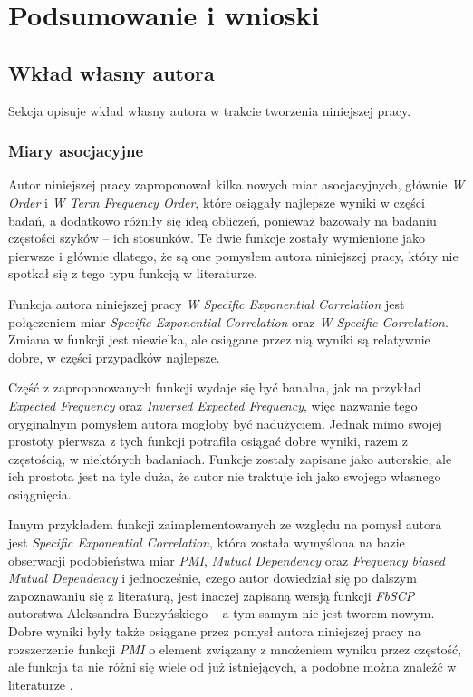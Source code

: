 
\chapter{Podsumowanie i wnioski}

\section{Wkład własny autora}
Sekcja opisuje wkład własny autora w trakcie tworzenia niniejszej pracy.

\subsection{Miary asocjacyjne}
Autor niniejszej pracy zaproponował kilka nowych miar asocjacyjnych, głównie \emph{W Order} i \emph{W Term Frequency Order}, które osiągały najlepsze wyniki w części badań, a dodatkowo różniły się ideą obliczeń, ponieważ bazowały na badaniu częstości szyków -- ich stosunków.
Te dwie funkcje zostały wymienione jako pierwsze i głównie dlatego, że są one pomysłem autora niniejszej pracy, który nie spotkał się z tego typu funkcją w literaturze.

\par
Funkcja autora niniejszej pracy \emph{W Specific Exponential Correlation} jest połączeniem miar \emph{Specific Exponential Correlation} oraz \emph{W Specific Correlation}.
Zmiana w funkcji jest niewielka, ale osiągane przez nią wyniki są relatywnie dobre, w części przypadków najlepsze.

\par
Część z zaproponowanych funkcji wydaje się być banalna, jak na przykład \emph{Expected Frequency} oraz \emph{Inversed Expected Frequency}, więc nazwanie tego oryginalnym pomysłem autora mogłoby być nadużyciem.
Jednak mimo swojej prostoty pierwsza z tych funkcji potrafiła osiągać dobre wyniki, razem z częstością, w niektórych badaniach.
Funkcje zostały zapisane jako autorskie, ale ich prostota jest na tyle duża, że autor nie traktuje ich jako swojego własnego osiągnięcia.

\par
Innym przykładem funkcji zaimplementowanych ze względu na pomysł autora jest \emph{Specific Exponential Correlation}, która została wymyślona na bazie obserwacji podobieństwa miar \emph{PMI}, \emph{Mutual Dependency} oraz \emph{Frequency biased Mutual Dependency} i jednocześnie, czego autor dowiedział się po dalszym zapoznawaniu się z literaturą, jest inaczej zapisaną wersją funkcji \emph{FbSCP} autorstwa Aleksandra Buczyńskiego \cite{buczynski} -- a tym samym nie jest tworem nowym. Dobre wyniki były także osiągane przez pomysł autora niniejszej pracy na rozszerzenie funkcji \emph{PMI} o element związany z mnożeniem wyniku przez częstość, ale funkcja ta nie różni się wiele od już istniejących, a podobne można znaleźć w literaturze \cite{wsec}.

